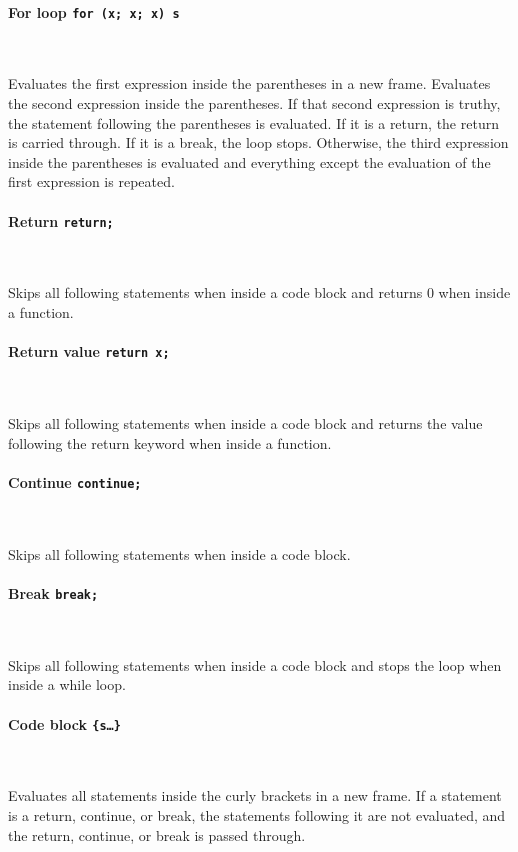 \paragraph{For loop \quad \texttt{for (x; x; x) s}} \

Evaluates the first expression inside the parentheses in a new frame. Evaluates the second expression inside the parentheses. If that second expression is truthy, the statement following the parentheses is evaluated. If it is a return, the return is carried through. If it is a break, the loop stops. Otherwise, the third expression inside the parentheses is evaluated and everything except the evaluation of the first expression is repeated.

\paragraph{Return \quad \texttt{return;}} \

Skips all following statements when inside a code block and returns 0 when inside a function.

\paragraph{Return value \quad \texttt{return x;}} \

Skips all following statements when inside a code block and returns the value following the return keyword when inside a function.

\paragraph{Continue \quad \texttt{continue;}} \

Skips all following statements when inside a code block.

\paragraph{Break \quad \texttt{break;}} \

Skips all following statements when inside a code block and stops the loop when inside a while loop.

\paragraph{Code block \quad \texttt{\{s\ldots\}}} \

Evaluates all statements inside the curly brackets in a new frame. If a statement is a return, continue, or break, the statements following it are not evaluated, and the return, continue, or break is passed through.

